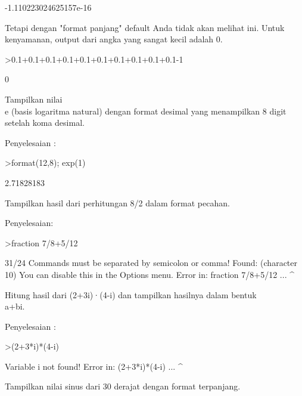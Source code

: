 \documentclass{article}
\begin{document}
\begin{eulernotebook}
\begin{eulercomment}
\begin{eulercomment}
\begin{euleroutput}
   -1.110223024625157e-16 
\end{euleroutput}
\begin{eulercomment}
Tetapi dengan "format panjang" default Anda tidak akan melihat ini.
Untuk kenyamanan, output dari angka yang sangat kecil adalah 0.
\end{eulercomment}
\begin{eulerprompt}
>0.1+0.1+0.1+0.1+0.1+0.1+0.1+0.1+0.1+0.1-1
\end{eulerprompt}
\begin{euleroutput}
  0
\end{euleroutput}
\begin{eulercomment}
Tampilkan nilai \\
e (basis logaritma natural) dengan format desimal yang menampilkan 8
digit setelah koma desimal.

Penyelesaian :
\end{eulercomment}
\begin{eulerprompt}
>format(12,8); exp(1)
\end{eulerprompt}
\begin{euleroutput}
   2.71828183 
\end{euleroutput}
\begin{eulercomment}
Tampilkan hasil dari perhitungan 8/2 dalam format pecahan.

Penyelesaian:
\end{eulercomment}
\begin{eulerprompt}
>fraction 7/8+5/12
\end{eulerprompt}
\begin{euleroutput}
  
  31/24
  Commands must be separated by semicolon or comma!
  Found: 
   (character 10)
  You can disable this in the Options menu.
  Error in:
  fraction 7/8+5/12
   ...
                   ^
\end{euleroutput}
\begin{eulercomment}
Hitung hasil dari (2+3i)·(4-i) dan tampilkan hasilnya dalam bentuk \\
a+bi.

Penyelesaian :
\end{eulercomment}
\begin{eulerprompt}
>(2+3*i)*(4-i)
\end{eulerprompt}
\begin{euleroutput}
  Variable i not found!
  Error in:
  (2+3*i)*(4-i) ...
        ^
\end{euleroutput}
\begin{eulercomment}
Tampilkan nilai sinus dari 30 derajat dengan format terpanjang.


\end{eulercomment}
\end{eulercomment}
\end{eulercomment}
\end{eulernotebook}
\end{document}
